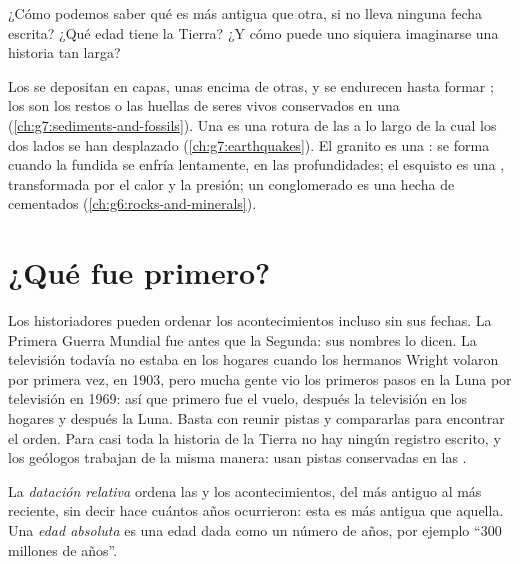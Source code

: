¿Cómo podemos saber qué  es más antigua que otra, si no lleva ninguna
fecha escrita? ¿Qué edad tiene la Tierra? ¿Y cómo puede uno siquiera
imaginarse una historia tan larga?

\begin{recall}
Los  se depositan en capas, unas encima de otras, y se endurecen
hasta formar ; los  son los restos o las huellas
de seres vivos conservados en una  (\cref{ch:g7:sediments-and-fossils}).
Una \emph{} es una rotura de las  a lo largo de la cual los dos
lados se han desplazado (\cref{ch:g7:earthquakes}). El granito es una
\emph{}: se forma cuando la  fundida se enfría lentamente, en
las profundidades; el esquisto es una \emph{}, transformada
por el calor y la presión; un conglomerado es una  hecha
de  cementados (\cref{ch:g6:rocks-and-minerals}).
\end{recall}

\section{¿Qué fue primero?}

Los historiadores pueden ordenar los acontecimientos incluso sin sus
fechas. La Primera Guerra Mundial fue antes que la Segunda: sus nombres lo
dicen. La televisión todavía no estaba en los hogares cuando los hermanos
Wright volaron por primera vez, en 1903, pero mucha gente vio los primeros
pasos en la Luna por televisión en 1969: así que primero fue el vuelo,
después la televisión en los hogares y después la Luna. Basta con reunir
pistas y compararlas para encontrar el orden. Para casi toda la historia de
la Tierra no hay ningún registro escrito, y los geólogos trabajan de la
misma manera: usan pistas conservadas en las .

\begin{definition}\label{def:g7:geological-time:relative-dating}
La \emph{datación relativa}
ordena las  y los acontecimientos, del más antiguo al más reciente,
sin decir hace cuántos años ocurrieron: esta  es más antigua que
aquella. Una \emph{edad absoluta} es una edad dada
como un número de años, por ejemplo ``\num{300} millones de años''.
\end{definition}

